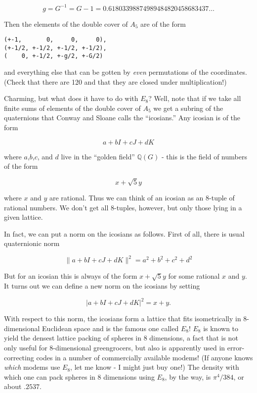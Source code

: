 \documentclass{article}
\begin{document}
\[g = G^{-1} = G - 1 = 0.61803398874989484820458683437\ldots\]

Then the elements of the double cover of \(A_5\) are of the form

\begin{verbatim}
(+-1,       0,     0,     0),
(+-1/2, +-1/2, +-1/2, +-1/2),
(    0, +-1/2, +-g/2, +-G/2)
\end{verbatim}

and everything else that can be gotten by \emph{even} permutations of
the coordinates. (Check that there are 120 and that they are closed
under multiplication!)

Charming, but what does it have to do with \(E_8\)? Well, note that if
we take all finite sums of elements of the double cover of \(A_5\) we
get a subring of the quaternions that Conway and Sloane calls the
``icosians.'' Any icosian is of the form

\[a + bI + cJ + dK\]

where \(a\),\(b\),\(c\), and \(d\) live in the ``golden field''
\(\mathbb{Q}(G)\) - this is the field of numbers of the form

\[x + \sqrt{5} y\]

where \(x\) and \(y\) are rational. Thus we can think of an icosian as
an 8-tuple of rational numbers. We don't get all 8-tuples, however, but
only those lying in a given lattice.

In fact, we can put a norm on the icosians as follows. First of all,
there is usual quaternionic norm

\[\|a + bI + cJ + dK\|^2 = a^2 + b^2 + c^2 + d^2\]

But for an icosian this is always of the form \(x + \sqrt{5} y\) for
some rational \(x\) and \(y\). It turns out we can define a new norm on
the icosians by setting

\[|a + bI + cJ + dK|^2 = x + y.\]

With respect to this norm, the icosians form a lattice that fits
isometrically in 8-dimensional Euclidean space and is the famous one
called \(E_8\)! \(E_8\) is known to yield the densest lattice packing of
spheres in 8 dimensions, a fact that is not only useful for
8-dimensional greengrocers, but also is apparently used in
error-correcting codes in a number of commercially available modems! (If
anyone knows \emph{which} modems use \(E_8\), let me know - I might just
buy one!) The density with which one can pack spheres in 8 dimensions
using \(E_8\), by the way, is \(\pi^4/384\), or about \(.2537\).
\end{document}
